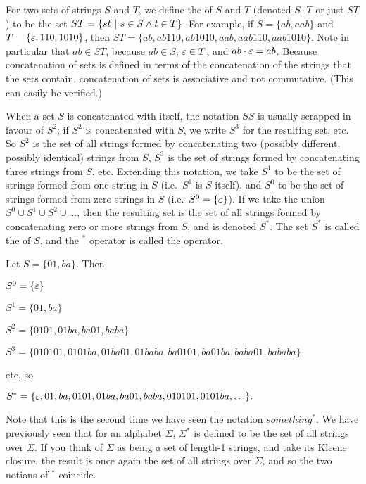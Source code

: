 For two sets of strings $S$ and $T$, we define the  of $S$ and
$T$ (denoted $S\cdot T$ 
or just $ST$) to
be the set $ST = \{ st \ | \ s \in S \wedge t \in T \}$.  For example, if $S =
\{ab, aab\}$ and $T=\{\varepsilon, 110, 1010\}$, then 
$ST = \{ab,  ab110,  ab1010,  aab,  aab110,  aab1010\}$.  
Note in particular that $ab \in ST$, because $ab \in S$, $\varepsilon \in T$, and
$ab \cdot \varepsilon = ab$.
Because 
concatenation of sets is defined in terms of the
concatenation of the
strings that the sets contain, concatenation of sets is associative
and not commutative.  (This can easily be verified.)  

When a set $S$
is concatenated with itself, the notation $SS$ is usually scrapped
in favour of $S^2$; if $S^2$ is concatenated with $S$, we write
$S^3$ for the resulting set, etc.  So $S^2$ is the set of all strings formed by
concatenating two (possibly different, possibly identical) strings from $S$,
$S^3$ is the set of strings formed by concatenating three strings from $S$,
etc.  Extending this notation, we take $S^1$ to be the set of strings formed
from one string in $S$ (i.e.\ $S^1$ is $S$ itself), and $S^0$ to be the set of
strings formed from zero strings in $S$ (i.e.\ $S^0 = \{\varepsilon\}$).  If we take
the union $S^0 \cup S^1 \cup S^2 \cup \ldots$, then the resulting set is the set of
all strings formed by concatenating zero or more strings from $S$, and is
denoted $S^*$.  The set $S^*$ is called the  of $S$, and
the $^*$ operator is called the  operator.

\smallskip

\begin{example}
Let $S = \{01, ba\}$.  Then

$S^0 = \{\varepsilon\}$

$S^1 = \{01, ba\}$

$S^2 = \{0101, 01ba, ba01, baba\}$

$S^3 = \{010101, 0101ba, 01ba01, 01baba, ba0101, ba01ba, baba01, bababa\}$

etc, so

$S^* =\{\varepsilon,01,ba,0101,01ba,ba01,baba,010101,0101ba,\ldots\}.$
\end{example}
 
\smallskip

Note that this is the second time we have seen the notation $something^*$.  We
have previously seen that for an alphabet $\Sigma$, $\Sigma^*$ is defined to be 
the set of all
strings over $\Sigma$.  If you think of $\Sigma$ as being a set of length-1
strings, and take its Kleene closure, the result is once again the set of all
strings over $\Sigma$, and so the two notions of $^*$ coincide.


